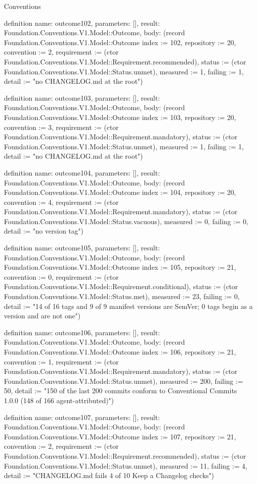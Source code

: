 \begin{lexlean}{Conventions}
\begin{semanticmodule}
definition{
  name: outcome102,
  parameters: [],
  result: Foundation.Conventions.V1.Model::Outcome,
  body: (record Foundation.Conventions.V1.Model::Outcome {index := 102, repository := 20, convention := 2, requirement := (ctor Foundation.Conventions.V1.Model::Requirement.recommended), status := (ctor Foundation.Conventions.V1.Model::Status.unmet), measured := 1, failing := 1, detail := "no CHANGELOG.md at the root"})
}

definition{
  name: outcome103,
  parameters: [],
  result: Foundation.Conventions.V1.Model::Outcome,
  body: (record Foundation.Conventions.V1.Model::Outcome {index := 103, repository := 20, convention := 3, requirement := (ctor Foundation.Conventions.V1.Model::Requirement.mandatory), status := (ctor Foundation.Conventions.V1.Model::Status.unmet), measured := 1, failing := 1, detail := "no CHANGELOG.md at the root"})
}

definition{
  name: outcome104,
  parameters: [],
  result: Foundation.Conventions.V1.Model::Outcome,
  body: (record Foundation.Conventions.V1.Model::Outcome {index := 104, repository := 20, convention := 4, requirement := (ctor Foundation.Conventions.V1.Model::Requirement.mandatory), status := (ctor Foundation.Conventions.V1.Model::Status.vacuous), measured := 0, failing := 0, detail := "no version tag"})
}

definition{
  name: outcome105,
  parameters: [],
  result: Foundation.Conventions.V1.Model::Outcome,
  body: (record Foundation.Conventions.V1.Model::Outcome {index := 105, repository := 21, convention := 0, requirement := (ctor Foundation.Conventions.V1.Model::Requirement.conditional), status := (ctor Foundation.Conventions.V1.Model::Status.met), measured := 23, failing := 0, detail := "14 of 16 tags and 9 of 9 manifest versions are SemVer; 0 tags begin as a version and are not one"})
}

definition{
  name: outcome106,
  parameters: [],
  result: Foundation.Conventions.V1.Model::Outcome,
  body: (record Foundation.Conventions.V1.Model::Outcome {index := 106, repository := 21, convention := 1, requirement := (ctor Foundation.Conventions.V1.Model::Requirement.mandatory), status := (ctor Foundation.Conventions.V1.Model::Status.unmet), measured := 200, failing := 50, detail := "150 of the last 200 commits conform to Conventional Commits 1.0.0 (148 of 166 agent-attributed)"})
}

definition{
  name: outcome107,
  parameters: [],
  result: Foundation.Conventions.V1.Model::Outcome,
  body: (record Foundation.Conventions.V1.Model::Outcome {index := 107, repository := 21, convention := 2, requirement := (ctor Foundation.Conventions.V1.Model::Requirement.recommended), status := (ctor Foundation.Conventions.V1.Model::Status.unmet), measured := 11, failing := 4, detail := "CHANGELOG.md fails 4 of 10 Keep a Changelog checks"})
}


\end{semanticmodule}
\end{lexlean}
